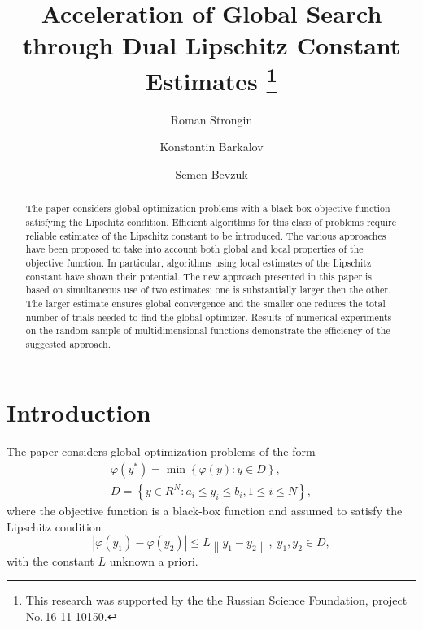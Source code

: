 \documentclass[runningheads]{llncs}
\begin{document}
%
\title{Acceleration of Global Search through Dual Lipschitz Constant Estimates
\thanks{This research was supported by the the Russian Science Foundation,
project No.\,16-11-10150.}}
%
%
\author{Roman Strongin%
\and Konstantin Barkalov%
\and Semen Bevzuk%
}
%
%
%
\maketitle              %
%
\begin{abstract}
The paper considers global optimization problems with a black-box objective 
function satisfying the Lipschitz condition. Efficient algorithms for this 
class of problems require reliable estimates of the Lipschitz constant to be 
introduced. The various approaches have been proposed to take into account both
global and local properties of the objective function. In particular, algorithms
using local estimates of the Lipschitz constant have shown their potential.
The new approach presented in this paper is based on simultaneous use of two
estimates: one is substantially larger then the other. 
The larger estimate ensures global convergence and the smaller one reduces 
the total number of trials needed to find the global optimizer.
Results of numerical experiments on the random sample of multidimensional 
functions demonstrate the efficiency of the suggested approach.  

\end{abstract}
%
%
%
\section{Introduction}

The paper considers global optimization problems of the form 
\begin{gather}
 \varphi(y^\ast)=\min{\left\{\varphi(y):y\in D\right\}},\\
 D=\left\{y\in R^N: a_i\leq y_i \leq b_i, 1\leq i \leq N\right\},
\end{gather}
where the objective function is a black-box function and assumed to satisfy the Lipschitz condition
\[
\left|\varphi(y_1)-\varphi(y_2)\right|\leq L\left\|y_1-y_2\right\|,\; y_1,y_2 \in D,
\]
with the constant $L$ unknown a priori.
\end{document}
